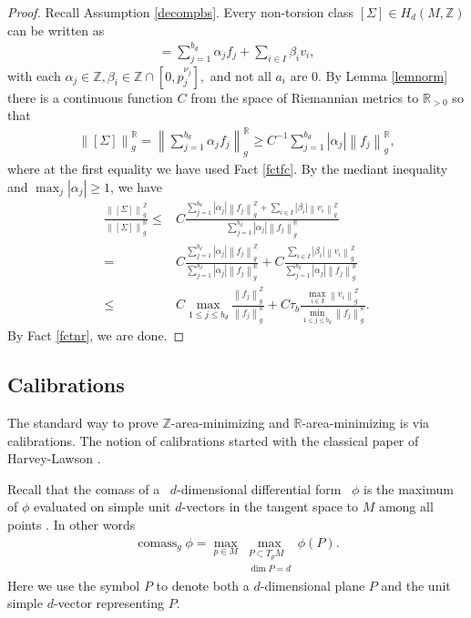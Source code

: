 \documentclass[11pt,a4paper]{amsart}
\numberwithin{equation}{section}
\newcommand{\ai}{\alpha}
\newcommand{\be}{\beta}
\newcommand{\Si}{\Sigma}
\newcommand{\cms}{\operatorname{comass}}
\newcommand{\s}{\subset}
\newcommand{\nog}[1]{\no{#1}^{\R}}
\newcommand{\no}[1]{\left\lVert#1\right\rVert}
\newcommand{\m}{^{-1}}
\newcommand{\R}{\mathbb{R}}
\newcommand{\Z}{\mathbb{Z}}
\theoremstyle{plain}
\theoremstyle{definition}
\numberwithin{equation}{subsection}
\begin{document}
	\begin{proof}
	Recall Assumption \ref{decompbs}. Every non-torsion class $[\Si]\in H_d(M,\Z)$ can be written as 
	\begin{align*}
		[\Si]=\sum_{j=1}^{b_d}\ai_jf_j+\sum_{i\in I}\be_iv_i,
	\end{align*}
	with each $\ai_j\in \Z,\be_i\in\Z\cap[0,p_j^{\nu_j}],$ and not all $a_i$ are $0.$ By Lemma \ref{lemnorm} there is a continuous function $C$ from the space of Riemannian metrics to $\R_{> 0}$ so that
	\begin{align*}
		\nog{[\Si]}_g=\no{\sum_{j=1}^{b_d}\ai_jf_j}^{\R}_g\ge C\m \sum_{j=1}^{b_d}|\ai_j|\no{f_j}^{\R}_g,
	\end{align*}where at the first equality we have used Fact \ref{fctfc}.
	By the mediant inequality and $\max_j|\ai_j|\ge 1$, we have
	\begin{align*}
		\frac{\no{[\Si]}_g^{\Z}}{\no{[\Si]}_g^{\R}}\le& C\frac{\sum_{j=1}^{b_d} |\ai_j|\no{f_j}_g^{\Z}+\sum_{i\in I}|\be_i|\no{v_i}^{\Z}_g}{\sum_{j=1}^{b_d}|\ai_j|\nog{f_j}_g}\\
		=&C\frac{\sum_{j=1}^{b_d} |\ai_j|\no{f_j}_g^{\Z}}{\sum_{j=1}^{b_d}|\ai_j|\nog{f_j}_g}+C\frac{
			\sum_{i\in I}|\be_i|\no{v_i}^{\Z}_g}{\sum_{j=1}^{b_d}|\ai_j|\nog{f_j}_g}\\
		\le&C\max_{1\le j\le b_d} \frac{\no{f_j}^{\Z}_g}{\no{f_j}_g^{\R}}+C\tau_b\frac{\max_{i\in I}\no{v_i}^{\Z}_g}{\min_{1\le j\le b_d}\no{f_j}_g^{\R}}.
	\end{align*}By Fact \ref{fctnr}, we are done.
	\end{proof}
		\subsection{Calibrations}\label{hscal}
	The standard way to prove $\Z$-area-minimizing and $\R$-area-minimizing is via calibrations. The notion of calibrations started with the classical paper of Harvey-Lawson \cite{HL}.
	
	Recall that the comass of a  $d$-dimensional differential form  $\phi$ is the maximum of $\phi$ evaluated on simple unit $d$-vectors in the tangent space to $M$ among all points \cite[Section 1.8]{HF}. In other words
	\begin{align}\label{defncms}
		\cms_g\phi=\max_{p\in M}\max_{\substack{P\s T_pM\\ \dim P=d}}\phi(P).
	\end{align}
	Here we use the symbol $P$ to denote both a $d$-dimensional plane $P$ and the unit simple $d$-vector representing $P.$
	
\end{document}
